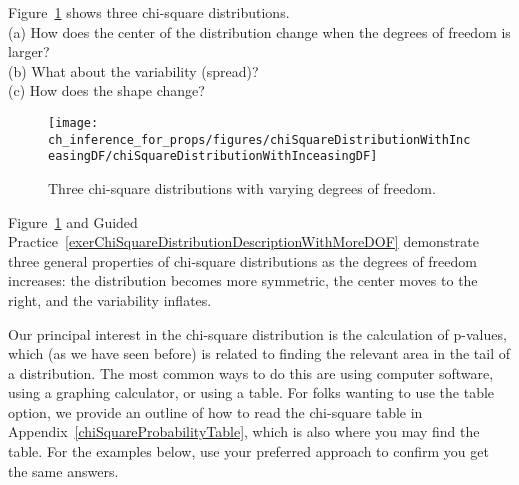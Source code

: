 \begin{exercisewrap}
\begin{nexercise}\label{exerChiSquareDistributionDescriptionWithMoreDOF}%
Figure~\ref{chiSquareDistributionWithInceasingDF} shows three chi-square distributions. \\
(a) How does the center of the distribution change when the degrees of freedom is larger? \\
(b) What about the variability (spread)? \\
(c) How does the shape change?\footnotemark
\end{nexercise}
\end{exercisewrap}

\begin{figure}[h]
\centering
\texttt{[image: ch\_inference\_for\_props/figures/chiSquareDistributionWithInceasingDF/chiSquareDistributionWithInceasingDF]}
\caption{Three chi-square distributions with varying degrees of freedom.}
\label{chiSquareDistributionWithInceasingDF}
\end{figure}

\D{\newpage}

Figure~\ref{chiSquareDistributionWithInceasingDF} and Guided Practice~\ref{exerChiSquareDistributionDescriptionWithMoreDOF} demonstrate three general properties of chi-square distributions as the degrees of freedom increases: the distribution becomes more symmetric, the center moves to the right, and the variability inflates.

Our principal interest in the chi-square distribution
is the calculation of p-values, which (as we have seen before)
is related to finding the relevant area in the tail of
a distribution.
The most common ways to do this are using computer software,
using a graphing calculator, or using a table.
For folks wanting to use the table option,
we provide an outline of how to read the chi-square table in
Appendix~\ref{chiSquareProbabilityTable},
which is also where you may find the table.
For the examples below, use your preferred approach
to confirm you get the same answers.

